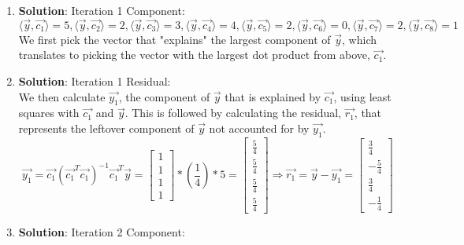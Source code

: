 \documentclass[11pt,letterpaper]{article}
\begin{document}
\begin{enumerate}
    \item \textbf{Solution}: Iteration 1 Component:
        \begin{equation*}
            \langle\vec{y},\vec{c_{1}}\rangle = 5,        \langle\vec{y},\vec{c_{2}}\rangle = 2,
            \langle\vec{y},\vec{c_{3}}\rangle = 3,
            \langle\vec{y},\vec{c_{4}}\rangle = 4,
            \langle\vec{y},\vec{c_{5}}\rangle = 2,
            \langle\vec{y},\vec{c_{6}}\rangle = 0,
            \langle\vec{y},\vec{c_{7}}\rangle = 2,
            \langle\vec{y},\vec{c_{8}}\rangle = 1
        \end{equation*}
        We first pick the vector that "explains" the largest component of $\vec{y}$, which translates to picking the vector with the largest dot product from above, $\vec{c_{1}}$.
	\item \textbf{Solution}: Iteration 1 Residual: \\
	    We then calculate $\vec{y_{1}}$, the component of $\vec{y}$ that is explained by $\vec{c_{1}}$, using least squares with $\vec{c_{1}}$ and $\vec{y}$. This is followed by calculating the residual, $\vec{r_{1}}$, that represents the leftover component of $\vec{y}$ not accounted for by $\vec{y_{1}}$.
	    \begin{equation*}
            \vec{y_{1}} = \vec{c_{1}}(\vec{c_{1}}^T\vec{c_{1}})^{-1}\vec{c_{1}}^T\vec{y} = \begin{bmatrix}
                 1 \\ 1 \\ 1 \\ 1
            \end{bmatrix} *(\frac{1}{4}) * 5
            = \begin{bmatrix}
                 \frac{5}{4} \\ \frac{5}{4} \\ \frac{5}{4} \\ \frac{5}{4}
            \end{bmatrix} \Rightarrow
            \vec{r_{1}} = \vec{y} - \vec{y_{1}} = 
            \begin{bmatrix}
                \frac{3}{4} \\ -\frac{5}{4} \\ \frac{3}{4} \\ -\frac{1}{4} 
            \end{bmatrix}
        \end{equation*}
	\item \textbf{Solution}: Iteration 2 Component: \\

\end{enumerate}
\end{document}
